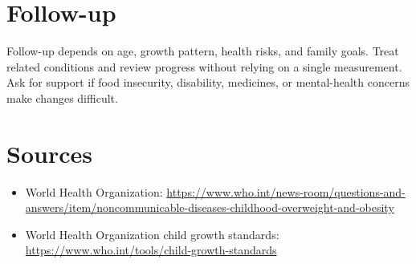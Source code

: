 \section*{Follow-up}
Follow-up depends on age, growth pattern, health risks, and family goals. Treat related conditions and review progress without relying on a single measurement. Ask for support if food insecurity, disability, medicines, or mental-health concerns make changes difficult.

\section*{Sources}
\begin{itemize}
\item World Health Organization: \url{https://www.who.int/news-room/questions-and-answers/item/noncommunicable-diseases-childhood-overweight-and-obesity}
\item World Health Organization child growth standards: \url{https://www.who.int/tools/child-growth-standards}
\end{itemize}
